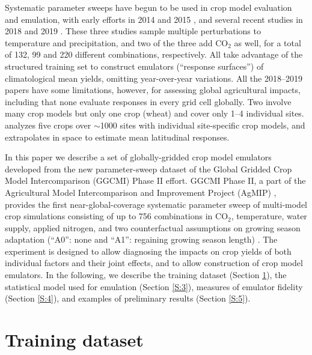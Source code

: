 \documentclass[gmd, manuscript]{copernicus} %
\begin{document}
Systematic parameter sweeps have begun to be used in crop model evaluation and emulation, with early efforts in 2014 and 2015 \citep{ruane2014, Markowski2015, Pirttioja2015}, and several recent studies in 2018 and 2019 \citep{FRONZEK20182, RUIZRAMOS2018,Snyder2018}. 
These three studies sample multiple perturbations to temperature and precipitation, and two of the three add CO$_2$ as well, for a total of 132, 99 and 220 different combinations, respectively. 
All take advantage of the structured training set to construct emulators (``response surfaces'') of climatological mean yields, omitting year-over-year variations. 
All the 2018--2019 papers have some limitations, however, for assessing global agricultural impacts, including that
none evaluate responses in every grid cell globally.
Two involve many crop models but only one crop (wheat) \citep{FRONZEK20182,RUIZRAMOS2018} and cover only 1--4 individual sites. 
\citet{Snyder2018} analyzes five crops over $\sim$1000 sites with individual site-specific crop models, and extrapolates in space to estimate mean latitudinal responses.

In this paper we describe a set of globally-gridded crop model emulators developed from the new parameter-sweep dataset of the Global Gridded Crop Model Intercomparison (GGCMI) Phase II effort. 
GGCMI Phase II, a part of the Agricultural Model Intercomparison and Improvement Project (AgMIP) \citep{ROSENZWEIG2013, Rosenzweig2014}, provides the first near-global-coverage systematic parameter sweep of multi-model crop simulations consisting of up to 756 combinations in CO$_2$, temperature, water supply, applied nitrogen, and two counterfactual assumptions on growing season adaptation (``A0'': none and ``A1'': regaining growing season length) \citep[CTWN-A, ][]{franke2019ctwnexperiment,minoli2019adaptation}.
The experiment is designed to allow diagnosing the impacts on crop yields of both individual factors and their joint effects, and to allow construction of crop model emulators.
In the following, we describe the training dataset (Section \ref{S:2}), the statistical model used for emulation (Section \ref{S:3}), measures of emulator fidelity (Section \ref{S:4}), and examples of preliminary results (Section \ref{S:5}). 

\section{Training dataset}
\label{S:2}
\end{document}
